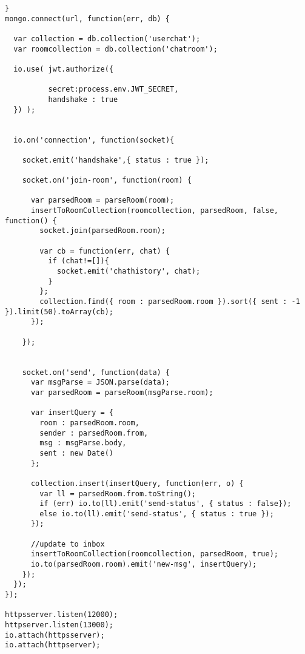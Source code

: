 \begin{lstlisting}[label=sc-socket-chat,style=htmlcssjs,caption= Implementasi Node.js + Socket.io untuk \textit{Chat}]
}
mongo.connect(url, function(err, db) {

  var collection = db.collection('userchat');
  var roomcollection = db.collection('chatroom');

  io.use( jwt.authorize({

          secret:process.env.JWT_SECRET,
          handshake : true
  }) );


  io.on('connection', function(socket){

    socket.emit('handshake',{ status : true });

    socket.on('join-room', function(room) {

      var parsedRoom = parseRoom(room);
      insertToRoomCollection(roomcollection, parsedRoom, false, function() {
        socket.join(parsedRoom.room);

        var cb = function(err, chat) {
          if (chat!=[]){
            socket.emit('chathistory', chat);
          }
        };
        collection.find({ room : parsedRoom.room }).sort({ sent : -1 }).limit(50).toArray(cb);
      });

    });


    socket.on('send', function(data) {
      var msgParse = JSON.parse(data);
      var parsedRoom = parseRoom(msgParse.room);

      var insertQuery = {
        room : parsedRoom.room,
        sender : parsedRoom.from,
        msg : msgParse.body,
        sent : new Date()
      };

      collection.insert(insertQuery, function(err, o) {
        var ll = parsedRoom.from.toString();
        if (err) io.to(ll).emit('send-status', { status : false});
        else io.to(ll).emit('send-status', { status : true });
      });

      //update to inbox
      insertToRoomCollection(roomcollection, parsedRoom, true);
      io.to(parsedRoom.room).emit('new-msg', insertQuery);
    });
  });
});

httpsserver.listen(12000);
httpserver.listen(13000);
io.attach(httpsserver);
io.attach(httpserver);
\end{lstlisting}